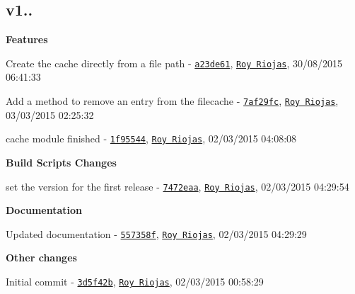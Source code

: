 \subsection*{v1..}


\begin{DoxyItemize}
\item {\bfseries Features}
\begin{DoxyItemize}
\item Create the cache directly from a file path -\/ \href{https://github.com/royriojas/file-entry-cache/commit/a23de61}{\tt a23de61}, \href{https://github.com/Roy Riojas}{\tt Roy Riojas}, 30/08/2015 06\+:41\+:33
\item Add a method to remove an entry from the filecache -\/ \href{https://github.com/royriojas/file-entry-cache/commit/7af29fc}{\tt 7af29fc}, \href{https://github.com/Roy Riojas}{\tt Roy Riojas}, 03/03/2015 02\+:25\+:32
\item cache module finished -\/ \href{https://github.com/royriojas/file-entry-cache/commit/1f95544}{\tt 1f95544}, \href{https://github.com/Roy Riojas}{\tt Roy Riojas}, 02/03/2015 04\+:08\+:08
\end{DoxyItemize}
\item {\bfseries Build Scripts Changes}
\begin{DoxyItemize}
\item set the version for the first release -\/ \href{https://github.com/royriojas/file-entry-cache/commit/7472eaa}{\tt 7472eaa}, \href{https://github.com/Roy Riojas}{\tt Roy Riojas}, 02/03/2015 04\+:29\+:54
\end{DoxyItemize}
\item {\bfseries Documentation}
\begin{DoxyItemize}
\item Updated documentation -\/ \href{https://github.com/royriojas/file-entry-cache/commit/557358f}{\tt 557358f}, \href{https://github.com/Roy Riojas}{\tt Roy Riojas}, 02/03/2015 04\+:29\+:29
\end{DoxyItemize}
\item {\bfseries Other changes}
\begin{DoxyItemize}
\item Initial commit -\/ \href{https://github.com/royriojas/file-entry-cache/commit/3d5f42b}{\tt 3d5f42b}, \href{https://github.com/Roy Riojas}{\tt Roy Riojas}, 02/03/2015 00\+:58\+:29 
\end{DoxyItemize}
\end{DoxyItemize}